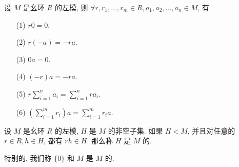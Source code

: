 \begin{proposition}
	设 $M$ 是幺环 $R$ 的左模, 则 $\forall r,r_1,\ldots,r_m\in R,a_1,a_2,\ldots,a_n\in M$, 有
	\begin{itemize}
		\item[(1)] $r0=0$.
		\item[(2)] $r(-a)=-ra$.
		\item[(3)] $0a=0$.
		\item[(4)] $(-r)a=-ra$.
		\item[(5)] $r\sum\limits_{i=1}^na_i=\sum\limits_{i=1}^n ra_i$.
		\item[(6)] $(\sum\limits_{i=1}^m r_i)a=\sum\limits_{i=1}^m r_ia$.
	\end{itemize}
\end{proposition}

\begin{definition}
	设 $M$ 是幺环 $R$ 的左模, $H$ 是 $M$ 的非空子集. 如果 $H<M$, 并且对任意的 $r\in R,h\in H$, 都有 $rh\in H$. 那么称 $H$ 是 $M$ 的.

	特别的, 我们称 $\{0\}$ 和 $M$ 是 $M$ 的.

\end{definition}